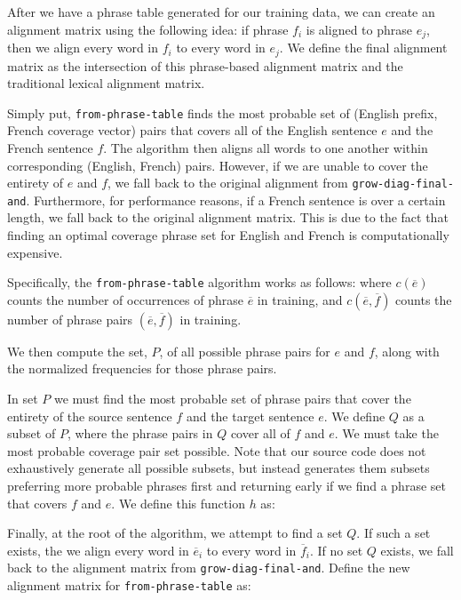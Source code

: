 \documentclass[twocolumn]{article}
\newcommand{\originalAlign}{\texttt{grow-diag-final-and}}
\newcommand{\phraseAlign}{\texttt{from-phrase-table}}
\begin{document}
After we have a phrase table generated for our training data, we can create an
alignment matrix using the following idea: if phrase $f_i$ is aligned to phrase
$e_j$, then we align every word in $f_i$ to every word in $e_j$. We define the
final alignment matrix as the intersection of this phrase-based alignment matrix
and the traditional lexical alignment matrix.

Simply put, \phraseAlign{} finds the most probable set of
(English prefix, French coverage vector) pairs that covers all of the English
sentence $e$ and the French sentence $f$. The algorithm then aligns all words to
one another within corresponding (English, French) pairs. However, if we are
unable to cover the entirety of $e$ and $f$, we fall back to the original
alignment from \originalAlign{}. Furthermore, for performance reasons, if a
French sentence is over a certain length, we fall back to the original alignment
matrix. This is due to the fact that finding an optimal coverage phrase set for
English and French is computationally expensive.

Specifically, the \phraseAlign{} algorithm works as follows:
\wrapSmall{\[ \phrasePairNorm{} \]}
where $c(\overline{e})$ counts the number of occurrences of phrase
$\overline{e}$ in training,
and $c(\overline{e},\overline{f})$ counts the number of phrase pairs
$(\overline{e},\overline{f})$ in training.

We then compute the set, $P$, of all possible phrase pairs for $e$ and $f$,
along with the normalized frequencies for those phrase pairs.
\wrapSmall{\allPhrasePairs{}}

In set $P$ we must find the most probable set of phrase pairs that cover the
entirety of the source sentence $f$ and the target sentence $e$. We define $Q$
as a subset of $P$, where the phrase pairs in $Q$ cover all of $f$ and $e$.
We must take the most probable coverage pair set possible. Note that our source
code does not exhaustively generate all possible subsets, but instead generates
them subsets preferring more probable phrases first and returning early if we
find a phrase set that covers $f$ and $e$. We define this function $h$ as:
\wrapSmall{\optPhraseCoverage{}}

Finally, at the root of the algorithm, we attempt to find a set $Q$. If such a
set exists, the we align every word in $\overline{e}_i$ to every word in
$\overline{f}_i$. If no set $Q$ exists, we fall back to the alignment matrix
from \originalAlign{}. Define the new alignment matrix for \phraseAlign{} as:
\wrapSmall{\growPhraseMatrix{}}
\end{document}

